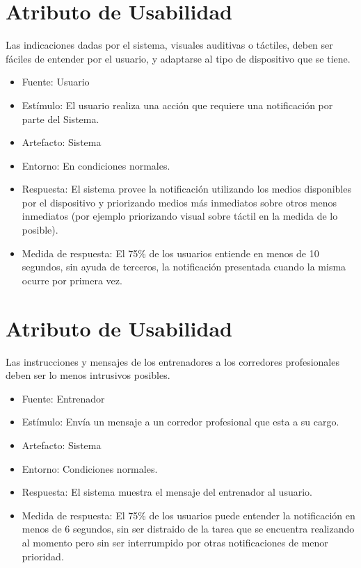 \section{Atributo de Usabilidad}

Las indicaciones dadas por el sistema, visuales auditivas o táctiles,
deben ser fáciles de entender por el usuario, y adaptarse al tipo de
dispositivo que se tiene.

\begin{itemize}
\itemsep1pt\parskip0pt
\item
  Fuente: Usuario
\item
  Estímulo: El usuario realiza una acción que requiere una notificación
  por parte del Sistema.
\item
  Artefacto: Sistema
\item
  Entorno: En condiciones normales.
\item
  Respuesta: El sistema provee la notificación utilizando los medios
  disponibles por el dispositivo y priorizando medios más inmediatos
  sobre otros menos inmediatos (por ejemplo priorizando visual sobre
  táctil en la medida de lo posible).
\item
  Medida de respuesta: El 75\% de los usuarios entiende en menos de 10
  segundos, sin ayuda de terceros, la notificación presentada cuando la
  misma ocurre por primera vez.
\end{itemize}

\section{Atributo de Usabilidad}

Las instrucciones y mensajes de los entrenadores a los corredores
profesionales deben ser lo menos intrusivos posibles.

\begin{itemize}
\itemsep1pt\parskip0pt
\item
  Fuente: Entrenador
\item
  Estímulo: Envía un mensaje a un corredor profesional que esta a su
  cargo.
\item
  Artefacto: Sistema
\item
  Entorno: Condiciones normales.
\item
  Respuesta: El sistema muestra el mensaje del entrenador al usuario.
\item
  Medida de respuesta: El 75\% de los usuarios puede entender la
  notificación en menos de 6 segundos, sin ser distraido de la tarea que
  se encuentra realizando al momento pero sin ser interrumpido por otras
  notificaciones de menor prioridad.
\end{itemize}

